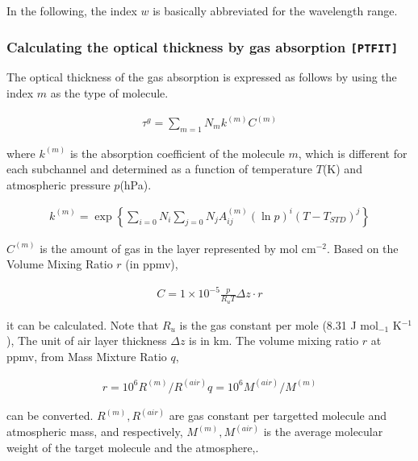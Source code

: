 In the following, the index \(w\) is basically abbreviated for the
wavelength range.

\hypertarget{calculating-the-optical-thickness-by-gas-absorption-moduleptfit}{%
\subsubsection{\texorpdfstring{Calculating the optical thickness by gas
absorption
\texttt{{[}PTFIT{]}}}{Calculating the optical thickness by gas absorption {[}PTFIT{]}}}\label{calculating-the-optical-thickness-by-gas-absorption-moduleptfit}}

The optical thickness of the gas absorption is expressed as follows
by using the index \(m\) as the type of molecule.

\begin{eqnarray}
  \tau^g = \sum_{m=1}{N_m} k^{(m)} C^{(m)}
\end{eqnarray}

where \(k^{(m)}\) is the absorption coefficient of the molecule \(m\),
which is different for each subchannel and determined as a function of temperature \(T\)(K) and atmospheric pressure
\(p\)(hPa).

\begin{eqnarray}
 k^{(m)} = \exp\left\{ \sum_{i=0}{N_i} \sum_{j=0}{N_j} A^{(m)}_{ij}
                   (\ln p)^{i} (T-T_{STD})^{j}
               \right\}
\end{eqnarray}

\(C^{(m)}\) is the amount of gas in the layer represented by
mol cm\(^{-2}\). Based on the Volume Mixing Ratio \(r\) (in ppmv),

\begin{eqnarray}
  C = 1\times 10^{-5} \frac{p}{R_u T} \Delta z \cdot r
\end{eqnarray}

it can be calculated. Note that \(R_u\) is the gas constant
per mole (8.31 J mol\(_{-1}\) K\(^{-1}\)), The unit of air layer
thickness \(\Delta z\) is in km. The volume mixing ratio \(r\) at ppmv, from Mass Mixture Ratio \(q\),

\begin{eqnarray}
  r = 10^6 R^{(m)}/R^{(air)} q = 10^6 M^{(air)}/M^{(m)}
\end{eqnarray}

can be converted. \(R^{(m)},R^{(air)}\) are gas constant per
targetted molecule and atmospheric mass, and respectively,
\(M^{(m)},M^{(air)}\) is the average molecular weight of the
target molecule and the atmosphere,.


